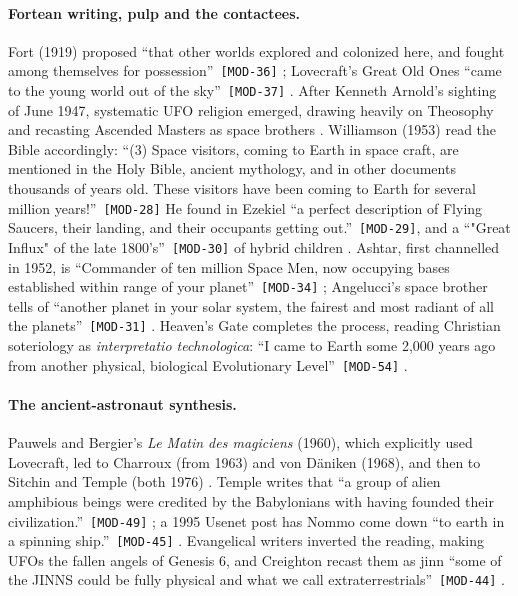 \documentclass[11pt,a4paper]{article}
\newcommand{\pid}[1]{\texttt{\small #1}}
\begin{document}
\paragraph{Fortean writing, pulp and the contactees.} Fort (1919) proposed \enquote{that other worlds explored and colonized here, and fought among themselves for possession}~\pid{[MOD-36]} \parencite{fort1919damned}; Lovecraft's Great Old Ones \enquote{came to the young world out of the sky}~\pid{[MOD-37]} \parencite{lovecraft1928cthulhu}. After Kenneth Arnold's sighting of June 1947, systematic UFO religion emerged, drawing heavily on Theosophy and recasting Ascended Masters as space brothers \parencite{partridge2003ufo}. Williamson (1953) read the Bible accordingly: \enquote{(3) Space visitors, coming to Earth in space craft, are mentioned in the Holy Bible, ancient mythology, and in other documents thousands of years old. These visitors have been coming to Earth for several million years!}~\pid{[MOD-28]} He found in Ezekiel \enquote{a perfect description of Flying Saucers, their landing, and their occupants getting out.}~\pid{[MOD-29]}, and a \enquote{"Great Influx" of the late 1800's}~\pid{[MOD-30]} of hybrid children \parencite{williamson1953tongues}. Ashtar, first channelled in 1952, is \enquote{Commander of ten million Space Men, now occupying bases established within range of your planet}~\pid{[MOD-34]} \parencite{hill1957days,vantassel1952ashtar,helland2003ashtar}; Angelucci's space brother tells of \enquote{another planet in your solar system, the fairest and most radiant of all the planets}~\pid{[MOD-31]} \parencite{angelucci1955secret}. Heaven's Gate completes the process, reading Christian soteriology as \emph{interpretatio technologica}: \enquote{I came to Earth some 2,000 years ago from another physical, biological Evolutionary Level}~\pid{[MOD-54]} \parencite{heavensgate1996jews,richter2012traces}.

\paragraph{The ancient-astronaut synthesis.} Pauwels and Bergier's \emph{Le Matin des magiciens} (1960), which explicitly used Lovecraft, led to Charroux (from 1963) and von Däniken (1968), and then to Sitchin and Temple (both 1976) \parencite{pauwels1960matin,charroux1963histoire,daniken1968erinnerungen,colavito2005cult}. Temple writes that \enquote{a group of alien amphibious beings were credited by the Babylonians with having founded their civilization.}~\pid{[MOD-49]} \parencite{temple1976sirius}; a 1995 Usenet post has Nommo come down \enquote{to earth in a spinning ship.}~\pid{[MOD-45]} \parencite{dolan1995dogon}. Evangelical writers inverted the reading, making UFOs the fallen angels of Genesis 6, and Creighton recast them as jinn \enquote{some of the JINNS could be fully physical and what we call extraterrestrials}~\pid{[MOD-44]} \parencite{keelynet1990nephilim,creighton1988jinns,partridge2004demonology}.
\end{document}
